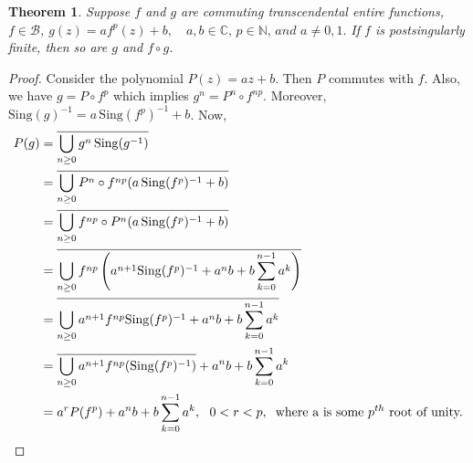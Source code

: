 \documentclass[a4paper,12pt]{amsart}
\numberwithin{equation}{section}
\newtheorem{theorem}{Theorem}[section]
\begin{document}
	\begin{theorem} \label{th3}
		Suppose $f$ and $g$ are commuting transcendental entire functions, $f\in \mathcal{B}$,
		$g(z) = a f^p(z) + b, \quad a,b \in \mathbb{C}, \, p\in \mathbb{N},  \, and \,\, a \neq 0,1.$
		If $f$ is postsingularly finite, then so are $g$ and $f \circ g$.
	\end{theorem}
	
	
	\begin{proof}
		Consider the polynomial $P(z)=az+b$. Then $P$ commutes with $f$. Also, we have $g=P\circ f^p$ which implies $g^n=P^n \circ f^{np}$. Moreover, $\mathrm{Sing}(g)^{-1}= a \, \mathrm{Sing}(f^p)^{-1}+b$. Now,
		\begin{align*}
			P(g)
			&=\overline{\bigcup_{n \geq 0}g^n \, \mathrm{Sing}(g^{-1})}\\
			&= \overline{\bigcup_{n \geq 0}P^n\circ f^{np}(a \, \mathrm{Sing}(f^p)^{-1}+b)}\\
			&= \overline{\bigcup_{n \geq 0} f^{np}\circ P^n(a \, \mathrm{Sing}(f^p)^{-1}+b)}\\
			&= \overline{\bigcup_{n \geq 0} f^{np} \left(a^{n+1} \mathrm{Sing}(f^p)^{-1} + a^nb +  b \sum_{k=0}^{n-1} a^k\right)}\\ 
			&= \overline{\bigcup_{n \geq 0} a^{n+1} f^{np} \mathrm{Sing}(f^p)^{-1} + a^nb +  b \sum_{k=0}^{n-1} a^k}\\ 
			&=  \overline{\bigcup_{n \geq 0} a^{n+1}f^{np} (\mathrm{Sing}(f^p)^{-1})}+ a^nb + b \sum_{k=0}^{n-1} a^k\\
			&= a^r P(f^p)+ a^nb +  b \sum_{k=0}^{n-1} a^k  , \, \, \, \, 0<r< p,\hspace{.2cm} \text {where a is some $p^{th}$ root of unity.}
		\end{align*} 

\end{proof}
\end{document}
